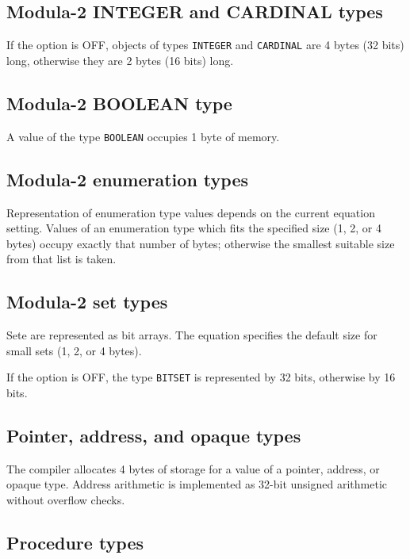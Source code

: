 \subsection{Modula-2 INTEGER and CARDINAL types}\label{lowlevel:datarep:whole}

If the option  is OFF, objects of types \verb'INTEGER'
and \verb'CARDINAL' are 4 bytes (32 bits) long, otherwise they are
2 bytes (16 bits) long.

\subsection{Modula-2 BOOLEAN type}\label{lowlevel:datarep:bool}

A value of the type \verb'BOOLEAN' occupies 1 byte of memory.

\subsection{Modula-2 enumeration types}

Representation of enumeration type values depends on the current
 equation setting. Values of an enumeration type which
fits the specified size (1, 2, or 4 bytes) occupy exactly that
number of bytes; otherwise the smallest suitable size from
that list is taken.

\subsection{Modula-2 set types}

Sete are represented as bit arrays. The  equation
specifies the default size for small sets (1, 2, or 4 bytes).

If the option  is OFF, the type {\tt BITSET}
is represented by 32 bits, otherwise by 16 bits.

\subsection{Pointer, address, and opaque types}

The \XDS{} compiler allocates 4 bytes of storage for a value
of a pointer, address, or opaque type.
Address arithmetic is implemented as 32-bit unsigned arithmetic
without overflow checks.

\subsection{Procedure types}

